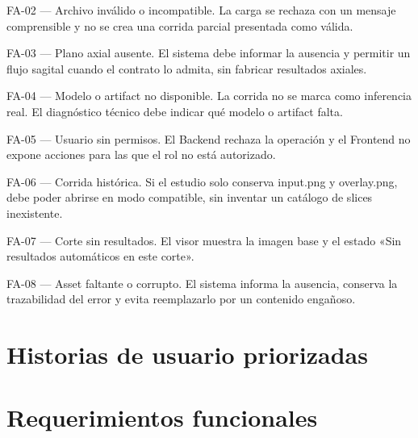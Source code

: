 FA-02 — Archivo inválido o incompatible. La carga se rechaza con un mensaje comprensible y no se crea una corrida parcial presentada como válida.

FA-03 — Plano axial ausente. El sistema debe informar la ausencia y permitir un flujo sagital cuando el contrato lo admita, sin fabricar resultados axiales.

FA-04 — Modelo o artifact no disponible. La corrida no se marca como inferencia real. El diagnóstico técnico debe indicar qué modelo o artifact falta.

FA-05 — Usuario sin permisos. El Backend rechaza la operación y el Frontend no expone acciones para las que el rol no está autorizado.

FA-06 — Corrida histórica. Si el estudio solo conserva input.png y overlay.png, debe poder abrirse en modo compatible, sin inventar un catálogo de slices inexistente.

FA-07 — Corte sin resultados. El visor muestra la imagen base y el estado «Sin resultados automáticos en este corte».

FA-08 — Asset faltante o corrupto. El sistema informa la ausencia, conserva la trazabilidad del error y evita reemplazarlo por un contenido engañoso.

\section{Historias de usuario priorizadas}


\section{Requerimientos funcionales}


